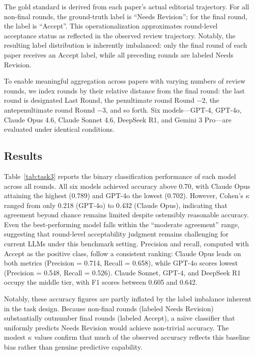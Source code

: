 \documentclass[preprint,10pt,times]{elsarticle}
\begin{document}
The gold standard is derived from each paper's actual editorial trajectory. For all non-final rounds, the ground-truth label is ``Needs Revision''; for the final round, the label is ``Accept''. This operationalization approximates round-level acceptance status as reflected in the observed review trajectory. Notably, the resulting label distribution is inherently imbalanced: only the final round of each paper receives an Accept label, while all preceding rounds are labeled Needs Revision.

To enable meaningful aggregation across papers with varying numbers of review rounds, we index rounds by their relative distance from the final round: the last round is designated Last Round, the penultimate round Round $-2$, the antepenultimate round Round $-3$, and so forth. Six models---GPT-4, GPT-4o, Claude Opus 4.6, Claude Sonnet 4.6, DeepSeek R1, and Gemini 3 Pro---are evaluated under identical conditions.

\subsection{Results}
\label{sec:t3-results}

Table~\ref{tab:task3} reports the binary classification performance of each model across all rounds. All six models achieved accuracy above 0.70, with Claude Opus attaining the highest (0.789) and GPT-4o the lowest (0.702). However, Cohen's $\kappa$ ranged from only 0.218 (GPT-4o) to 0.432 (Claude Opus), indicating that agreement beyond chance remains limited despite ostensibly reasonable accuracy. Even the best-performing model falls within the ``moderate agreement'' range, suggesting that round-level acceptability judgment remains challenging for current LLMs under this benchmark setting. Precision and recall, computed with Accept as the positive class, follow a consistent ranking: Claude Opus leads on both metrics (Precision = 0.714, Recall = 0.658), while GPT-4o scores lowest (Precision = 0.548, Recall = 0.526). Claude Sonnet, GPT-4, and DeepSeek R1 occupy the middle tier, with F1 scores between 0.605 and 0.642.

Notably, these accuracy figures are partly inflated by the label imbalance inherent in the task design. Because non-final rounds (labeled Needs Revision) substantially outnumber final rounds (labeled Accept), a na\"{\i}ve classifier that uniformly predicts Needs Revision would achieve non-trivial accuracy. The modest $\kappa$ values confirm that much of the observed accuracy reflects this baseline bias rather than genuine predictive capability.
\end{document}
